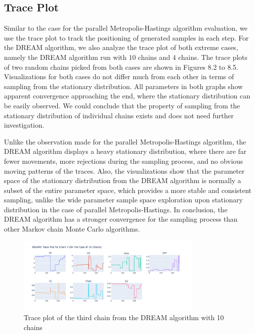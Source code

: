 \subsection{Trace Plot}
Similar to the case for the parallel Metropolis-Hastings algorithm evaluation, we use the trace plot to track the positioning of generated samples in each step. For the DREAM algorithm, we also analyze the trace plot of both extreme cases, namely the DREAM algorithm run with $10$ chains and $4$ chains. The trace plots of two random chains picked from both cases are shown in Figures 8.2 to 8.5. Visualizations for both cases do not differ much from each other in terms of sampling from the stationary distribution. All parameters in both graphs show apparent convergence approaching the end, where the stationary distribution can be easily observed. We could conclude that the property of sampling from the stationary distribution of individual chains exists and does not need further investigation.

Unlike the observation made for the parallel Metropolis-Hastings algorithm, the DREAM algorithm displays a heavy stationary distribution, where there are far fewer movements, more rejections during the sampling process, and no obvious moving patterns of the traces. Also, the visualizations show that the parameter space of the stationary distribution from the DREAM algorithm is normally a subset of the entire parameter space, which provides a more stable and consistent sampling, unlike the wide parameter sample space exploration upon stationary distribution in the case of parallel Metropolis-Hastings. In conclusion, the DREAM algorithm has a stronger convergence for the sampling process than other Markov chain Monte Carlo algorithms.

\begin{figure}[H]
    \centering
    \includegraphics[width=0.8\textwidth]{figures/dream/tp_rand_10_3.png}
    \captionsetup{width=.8\textwidth}
    \caption{Trace plot of the third chain from the DREAM algorithm with 10 chains}
    \label{fig:enter-label}
\end{figure}

